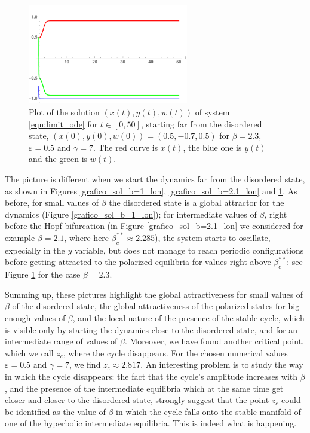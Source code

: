 \documentclass[a4paper,10pt,leqno]{amsart}
\theoremstyle{plain}
\begin{document}
\begin{figure}   
\centering   
\includegraphics[width=7cm]{ode_1d_b=2_3_lontano.pdf}   
\caption{Plot of the solution $(x(t),y(t),w(t))$ of system \eqref{eqn:limit_ode} for $t \in [0,50]$, starting far from the disordered state, $(x(0),y(0),w(0)) = (0.5,-0.7,0.5)$ for $\beta = 2.3$, $\varepsilon = 0.5$ and $\gamma = 7$. The red curve is $x(t)$, the blue one is $y(t)$ and the green is $w(t)$.}   
\label{grafico_sol_b=2.3_lon}   
\end{figure}   

The picture is different when we start the dynamics far from the disordered state, as shown in Figures \ref{grafico_sol_b=1_lon}, \ref{grafico_sol_b=2.1_lon} and \ref{grafico_sol_b=2.3_lon}. As before, for small values of $\beta$ the disordered state is a global attractor for the dynamics (Figure \ref{grafico_sol_b=1_lon}); for intermediate values of $\beta$, right before the Hopf bifurcation (in Figure \ref{grafico_sol_b=2.1_lon} we considered for example $\beta = 2.1$, where here $\beta^{**}_c \approx 2.285$), the system starts to oscillate, expecially in the $y$ variable, but does not manage to reach periodic configurations before getting attracted to the polarized equilibria for values right above $\beta^{**}_c$: see Figure \ref{grafico_sol_b=2.3_lon} for the case $\beta = 2.3$.

Summing up, these pictures highlight the global attractiveness for small values of $\beta$ of the disordered state, the global attractiveness of the polarized states for big enough values of $\beta$, and the local nature of the presence of the stable cycle, which is visible only by starting the dynamics close to the disordered state, and for an intermediate range of values of $\beta$. Moreover, we have found another critical point, which we call $z_c$, where the cycle disappears. For the chosen numerical values $\varepsilon = 0.5$ and $\gamma = 7$, we find $z_c \approx 2.817$. An interesting problem is to study the way in which the cycle disappears: the fact that the cycle's amplitude increases with $\beta$, and the presence of the intermediate equilibria which at the same time get closer and closer to the disordered state, strongly suggest that the point $z_c$ could be identified as the value of $\beta$ in which the cycle falls onto the stable manifold of one of the hyperbolic intermediate equilibria. This is indeed what is happening. 
\end{document}
